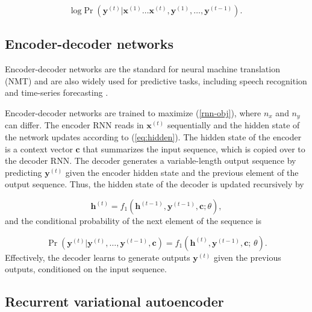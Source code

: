 \documentclass[hidelinks,12pt]{article}
\begin{document}
\begin{equation} \label{rnn-obj}
\text{log} \Pr \left(\boldsymbol{y}^{(t)} | \boldsymbol{x}^{(1)} \ldots \boldsymbol{x}^{(t)},\boldsymbol{y}^{(1)}, \ldots, \boldsymbol{y}^{(t-1)} \right).
\end{equation}

\subsection{Encoder-decoder networks}

Encoder-decoder networks are the standard for neural machine translation (NMT) \citep{cho2014learning,bahdanau2014neural,vinyals2014grammar} and are also widely used for predictive tasks, including speech recognition \citep{chorowski2015attention} and time-series forecasting \citep{zhu2017deep}. 

Encoder-decoder networks are trained to maximize (\ref{rnn-obj}), where $n_x$ and $n_y$ can differ. The encoder RNN reads in $\boldsymbol{x}^{(t)}$ sequentially and the hidden state of the network updates according to (\ref{eq:hidden}). The hidden state of the encoder is a context vector $\boldsymbol{c}$ that summarizes the input sequence, which is copied over to the decoder RNN. The decoder generates a variable-length output sequence by predicting $\boldsymbol{y}^{(t)}$ given the encoder hidden state and the previous element of the output sequence. Thus, the hidden state of the decoder is updated recursively by

\begin{equation}
\boldsymbol{h}^{(t)} = f_1 \left( \boldsymbol{h}^{(t-1)}, \boldsymbol{y}^{(t-1)}, \boldsymbol{c}; \theta \right), \label{eq:decoder}
\end{equation} and the conditional probability of the next element of the sequence is 

\begin{equation}
\Pr (\boldsymbol{y}^{(t)} | \boldsymbol{y}^{(t)}, \ldots, \boldsymbol{y}^{(t-1)}, \boldsymbol{c}) =  f_1 \left( \boldsymbol{h}^{(t)}, \boldsymbol{y}^{(t-1)}, \boldsymbol{c}; \, \theta \right).
\end{equation}  Effectively, the decoder learns to generate outputs $\boldsymbol{y}^{(t)}$ given the previous outputs, conditioned on the input sequence. 

\subsection{Recurrent variational autoencoder}
\end{document}
